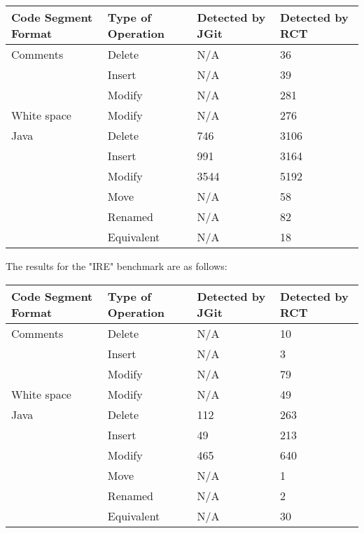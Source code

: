 \begin{table}[H]
    \begin{tabular}{llll}
    Code Segment Format & Type of Operation & Detected by JGit & Detected by RCT \\ \hline
    Comments            & Delete            & N/A              & 36              \\
    ~                   & Insert            & N/A              & 39              \\
    ~                   & Modify            & N/A              & 281             \\
    White space         & Modify            & N/A              & 276             \\
    Java                & Delete            & 746              & 3106            \\
    ~                   & Insert            & 991              & 3164            \\
    ~                   & Modify            & 3544             & 5192            \\
    ~                   & Move              & N/A              & 58              \\
    ~                   & Renamed           & N/A              & 82              \\
    ~                   & Equivalent        & N/A              & 18              \\
    \end{tabular}
\end{table}

The results for the "IRE" benchmark are as follows:

\begin{table}[H]
    \begin{tabular}{llll}
    Code Segment Format & Type of Operation & Detected by JGit & Detected by RCT \\ \hline
    Comments            & Delete            & N/A              & 10              \\
    ~                   & Insert            & N/A              & 3               \\
    ~                   & Modify            & N/A              & 79              \\
    White space         & Modify            & N/A              & 49              \\
    Java                & Delete            & 112              & 263             \\
    ~                   & Insert            & 49               & 213             \\
    ~                   & Modify            & 465              & 640             \\
    ~                   & Move              & N/A              & 1               \\
    ~                   & Renamed           & N/A              & 2               \\
    ~                   & Equivalent        & N/A              & 30              \\
    \end{tabular}
\end{table}


